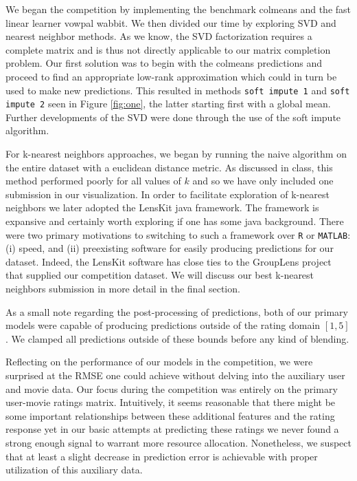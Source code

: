 \documentclass[oneside]{article}
\begin{document}
We began the competition by implementing the benchmark colmeans and the fast linear learner vowpal wabbit. We then divided our time by exploring SVD and nearest neighbor methods. As we know, the SVD factorization requires a complete matrix and is thus not directly applicable to our matrix completion problem. Our first solution was to begin with the colmeans predictions and proceed to find an appropriate low-rank approximation which could in turn be used to make new predictions. This resulted in methods \verb|soft impute 1| and \verb|soft impute 2| seen in Figure \ref{fig:one}, the latter starting first with a global mean. Further developments of the SVD were done through the use of the soft impute algorithm.

For k-nearest neighbors approaches, we began by running the naive algorithm on the entire dataset with a euclidean distance metric. As discussed in class, this method performed poorly for all values of $k$ and so we have only included one submission in our visualization. In order to facilitate exploration of k-nearest neighbors we later adopted the LensKit java framework. The framework is expansive and certainly worth exploring if one has some java background. There were two primary motivations to switching to such a framework over \verb|R| or \verb|MATLAB|: (i) speed, and (ii) preexisting software for easily producing predictions for our dataset. Indeed, the LensKit software has close ties to the GroupLens project that supplied our competition dataset. We will discuss our best k-nearest neighbors submission in more detail in the final section. 

As a small note regarding the post-processing of predictions, both of our primary models were capable of producing predictions outside of the rating domain $[1, 5]$. We clamped all predictions outside of these bounds before any kind of blending. 

Reflecting on the performance of our models in the competition, we were surprised at the RMSE one could achieve without delving into the auxiliary user and movie data. Our focus during the competition was entirely on the primary user-movie ratings matrix. Intuitively, it seems reasonable that there might be some important relationships between these additional features and the rating response yet in our basic attempts at predicting these ratings we never found a strong enough signal to warrant more resource allocation. Nonetheless, we suspect that at least a slight decrease in prediction error is achievable with proper utilization of this auxiliary data.
\end{document}
